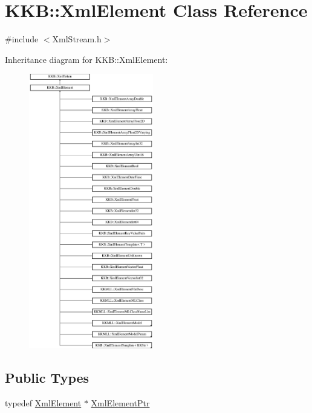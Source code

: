 \hypertarget{class_k_k_b_1_1_xml_element}{}\section{K\+KB\+:\+:Xml\+Element Class Reference}
\label{class_k_k_b_1_1_xml_element}


{\ttfamily \#include $<$Xml\+Stream.\+h$>$}

Inheritance diagram for K\+KB\+:\+:Xml\+Element\+:\begin{figure}[H]
\begin{center}
\leavevmode
\includegraphics[height=12.000000cm]{class_k_k_b_1_1_xml_element}
\end{center}
\end{figure}
\subsection*{Public Types}
\begin{DoxyCompactItemize}
\item 
typedef \hyperlink{class_k_k_b_1_1_xml_element}{Xml\+Element} $\ast$ \hyperlink{class_k_k_b_1_1_xml_element_ac1957d6e4bdc44e6b876b44cee0941be}{Xml\+Element\+Ptr}
\end{DoxyCompactItemize}
